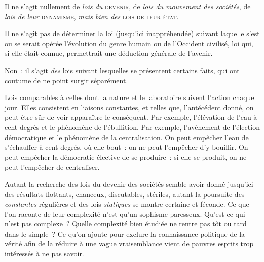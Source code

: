 \documentclass[french,twoside]{book} %
\begin{document}
\noindent Il ne s’agit nullement de \emph{lois du} {\scshape devenir}, de \emph{lois du mouvement des sociétés}, de \emph{lois de leur} {\scshape dynamisme}, \emph{mais bien des} {\scshape lois de leur état}.\par
Il ne s’agit pas de déterminer la loi (jusqu’ici inappréhendée) suivant laquelle s’est ou se serait opérée l’évolution du genre humain ou de l’Occident civilisé, loi qui, si elle était connue, permettrait une déduction générale de l’avenir.\par
Non : il s’agit \emph{des} lois suivant lesquelles se présentent certains faits, qui ont coutume de ne point surgir séparément.\par
Lois comparables à celles dont la nature et le laboratoire suivent l’action chaque jour. Elles consistent en liaisons constantes, et telles que, l’antécédent donné, on peut être sûr de voir apparaître le conséquent. Par exemple, l’élévation de l’eau à cent degrés et le phénomène de l’ébullition. Par exemple, l’avènement de l’élection démocratique et le phénomène de la centralisation. On peut empêcher l’eau de s’échauffer à cent degrés, où elle bout : on ne peut l’empêcher d’y bouillir. On peut empêcher la démocratie élective de se produire : si elle se produit, on ne peut l’empêcher de centraliser.\par
Autant la recherche des lois du devenir des sociétés semble avoir donné jusqu’ici des résultats flottants, chanceux, discutables, stériles, autant la poursuite des \emph{constantes} régulières et des lois \emph{statiques} se montre certaine et féconde. Ce que l’on raconte de leur complexité n’est qu’un sophisme paresseux. Qu’est ce qui n’est pas complexe ? Quelle complexité bien étudiée ne rentre pas tôt ou tard dans le simple ? Ce qu’on ajoute pour exclure la connaissance politique de la vérité afin de la réduire à une vague vraisemblance vient de pauvres esprits trop intéressés à ne pas savoir.\par
\end{document}
